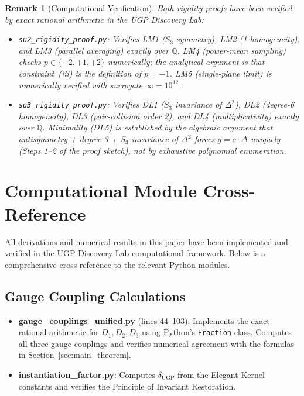 \documentclass[11pt,twocolumn]{article}
\newtheorem{remark}{Remark}[section]
\begin{document}
\begin{remark}[Computational Verification]
\label{rem:comp_verification}
Both rigidity proofs have been verified by exact rational arithmetic in the UGP Discovery Lab:
\begin{itemize}[itemsep=0.1em]
\item \texttt{su2\_rigidity\_proof.py}: Verifies LM1 ($S_3$ symmetry), LM2 (1-homo\-ge\-neity), and LM3 (parallel averaging) exactly over $\mathbb{Q}$. LM4 (power-mean sampling) checks $p\in\{-2,+1,+2\}$ numerically; the analytical argument is that constraint~(iii) is the definition of $p=-1$. LM5 (single-plane limit) is numerically verified with surrogate $\infty = 10^{12}$.
\item \texttt{su3\_rigidity\_proof.py}: Verifies DL1 ($S_3$ invariance of $\Delta^2$), DL2 (degree-6 homogeneity), DL3 (pair-collision order 2), and DL4 (multiplicativity) exactly over $\mathbb{Q}$. Minimality (DL5) is established by the algebraic argument that antisymmetry + degree-3 + $S_3$-invariance of $\Delta^2$ forces $g = c\cdot\Delta$ uniquely (Steps 1–2 of the proof sketch), not by exhaustive polynomial enumeration.
\end{itemize}
\end{remark}

\section{Computational Module Cross-Reference}
\label{app:code_modules}

All derivations and numerical results in this paper have been implemented and verified in the UGP Discovery Lab computational framework. Below is a comprehensive cross-reference to the relevant Python modules.

\subsection{Gauge Coupling Calculations}
\begin{itemize}[leftmargin=1.5em,itemsep=0.2em]
\item \textbf{gauge\_couplings\_unified.py} (lines 44--103): Implements the exact rational arithmetic for $D_1, D_2, D_3$ using Python's \texttt{Fraction} class. Computes all three gauge couplings and verifies numerical agreement with the formulas in Section~\ref{sec:main_theorem}.
\item \textbf{instantiation\_factor.py}: Computes $\delta_{\text{UGP}}$ from the Elegant Kernel constants and verifies the Principle of Invariant Restoration.
\end{itemize}
\end{document}
